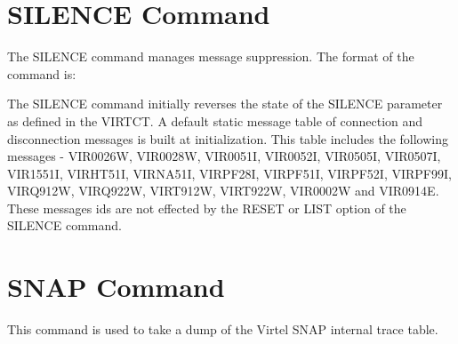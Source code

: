 \documentclass[letterpaper,10pt,english]{sphinxmanual}
\begin{document}
\newpage

\ignorespaces 

\section{SILENCE Command}
\label{\detokenize{audit_operations_ and_performance:silence-command}}\label{\detokenize{audit_operations_ and_performance:index-18}}
The SILENCE command manages message suppression. The format of the command is:

\begin{sphinxVerbatim}[commandchars=\\\{\}]
                          
                
             
                     
                 
\end{sphinxVerbatim}

The SILENCE command initially reverses the state of the SILENCE parameter as defined in the VIRTCT. A default static message table of connection and disconnection messages is built at initialization. This table includes the following messages - VIR0026W, VIR0028W, VIR0051I, VIR0052I, VIR0505I, VIR0507I, VIR1551I, VIRHT51I, VIRNA51I, VIRPF28I, VIRPF51I, VIRPF52I, VIRPF99I, VIRQ912W, VIRQ922W, VIRT912W, VIRT922W, VIR0002W and VIR0914E. These messages ids are not effected by the RESET or LIST option of the SILENCE command.

\ignorespaces 

\section{SNAP Command}
\label{\detokenize{audit_operations_ and_performance:snap-command}}\label{\detokenize{audit_operations_ and_performance:index-19}}
This command is used to take a dump of the Virtel SNAP internal trace table.
\end{document}
